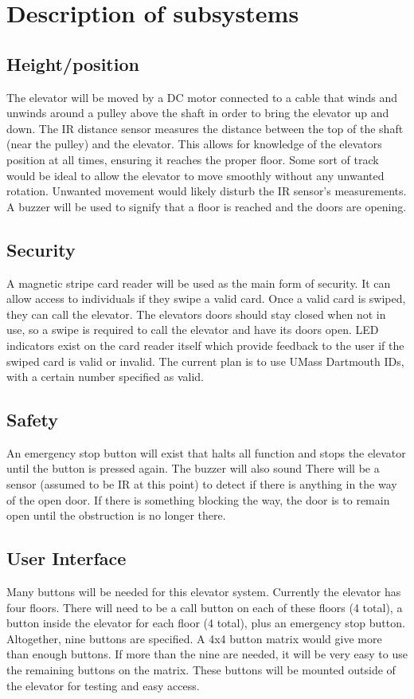 \documentclass{article}
\begin{document}
	\section{Description of subsystems}
	    \subsection{Height/position}
	    The elevator will be moved by a DC motor connected to a cable that winds and unwinds around a pulley above the shaft in order to bring the elevator up and down. The IR distance sensor measures the distance between the top of the shaft (near the pulley) and the elevator. This allows for knowledge of the elevators position at all times, ensuring it reaches the proper floor. Some sort of track would be ideal to allow the elevator to move smoothly without any unwanted rotation. Unwanted movement would likely disturb the IR sensor's measurements. A buzzer will be used to signify that a floor is reached and the doors are opening.
	    
	    \subsection{Security}
	    A magnetic stripe card reader will be used as the main form of security. It can allow access to individuals if they swipe a valid card. Once a valid card is swiped, they can call the elevator. The elevators doors should stay closed when not in use, so a swipe is required to call the elevator and have its doors open. LED indicators exist on the card reader itself which provide feedback to the user if the swiped card is valid or invalid. The current plan is to use UMass Dartmouth IDs, with a certain number specified as valid.
	    
	    \subsection{Safety}
	    An emergency stop button will exist that halts all function and stops the elevator until the button is pressed again. The buzzer will also sound There will be a sensor (assumed to be IR at this point) to detect if there is anything in the way of the open door. If there is something blocking the way, the door is to remain open until the obstruction is no longer there.
	    
	    \subsection{User Interface}
	    Many buttons will be needed for this elevator system. Currently the elevator has four floors. There will need to be a call button on each of these floors (4 total), a button inside the elevator for each floor (4 total), plus an emergency stop button. Altogether, nine buttons are specified. A 4x4 button matrix would give more than enough buttons. If more than the nine are needed, it will be very easy to use the remaining buttons on the matrix. These buttons will be mounted outside of the elevator for testing and easy access.
	    
\end{document}
